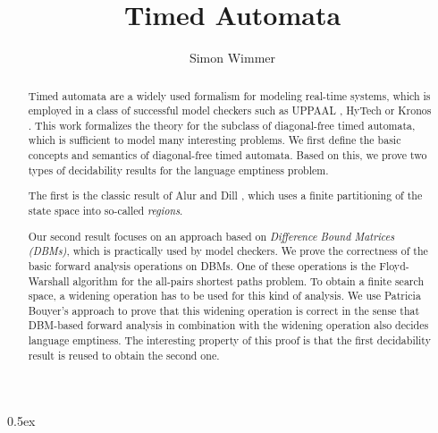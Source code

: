 \documentclass[11pt,a4paper]{article}
\begin{document}
\title{Timed Automata}
\author{Simon Wimmer}

\maketitle
\begin{abstract}
  Timed automata are a widely used formalism for modeling real-time systems, which is employed
  in a class of successful model checkers such as UPPAAL \cite{Larsen1997},
  HyTech \cite{Henzinger97hytech} or Kronos \cite{Kronos97}.
  This work formalizes the theory for the subclass of diagonal-free timed automata, which is
  sufficient to model many interesting problems.
  We first define the basic concepts and semantics of diagonal-free timed automata.
  Based on this, we prove two types of decidability results for the language emptiness problem.

  The first is the classic result of Alur and Dill \cite{alur_automata_1990,alur_theory_1994},
  which uses a finite partitioning of the state space into so-called \textit{regions}.

  Our second result focuses on an approach based on \textit{Difference Bound Matrices (DBMs)},
  which is practically used by model checkers.
  We prove the correctness of the basic forward analysis operations on DBMs.
  One of these operations is the Floyd-Warshall algorithm for the all-pairs
  shortest paths problem.
  To obtain a finite
  search space, a widening operation has to be used for this kind of analysis.
  We use Patricia Bouyer's \cite{Bou_Forward_Analysis} approach to prove that this widening operation
  is correct in the sense that DBM-based forward analysis in combination with the widening operation
  also decides language emptiness. The interesting property of this proof is that the first
  decidability result is reused to obtain the second one.
\end{abstract}

\setcounter{tocdepth}{2}
\tableofcontents
\newpage

\parindent 0pt\parskip 0.5ex



%
%
\end{document}
